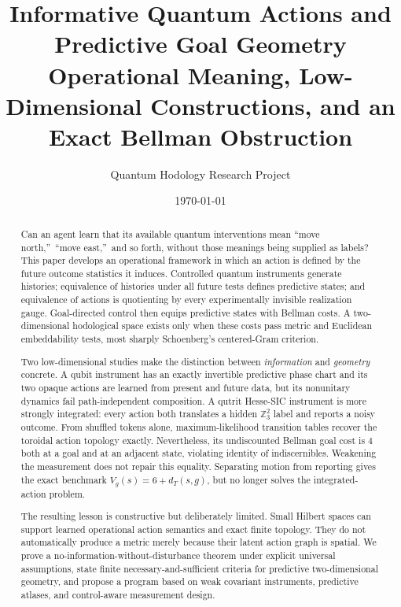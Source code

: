 \documentclass[11pt]{article}
\title{\textbf{Informative Quantum Actions and Predictive Goal Geometry}\\
\large Operational Meaning, Low-Dimensional Constructions, and an Exact Bellman Obstruction}
\author{Quantum Hodology Research Project}
\date{\today}
\theoremstyle{definition}
\theoremstyle{remark}
\newcommand{\Z}{\mathbb Z}
\begin{document}
\maketitle

\begin{abstract}
Can an agent learn that its available quantum interventions mean
\textquotedblleft move north,\textquotedblright\ \textquotedblleft move
east,\textquotedblright\ and so forth, without those meanings being supplied
as labels? This paper develops an operational framework in which an action is
defined by the future outcome statistics it induces. Controlled quantum
instruments generate histories; equivalence of histories under all future
tests defines predictive states; and equivalence of actions is quotienting by
every experimentally invisible realization gauge. Goal-directed control then
equips predictive states with Bellman costs. A two-dimensional hodological
space exists only when these costs pass metric and Euclidean embeddability
tests, most sharply Schoenberg's centered-Gram criterion.

Two low-dimensional studies make the distinction between \emph{information}
and \emph{geometry} concrete. A qubit instrument has an exactly invertible
predictive phase chart and its two opaque actions are learned from present and
future data, but its nonunitary dynamics fail path-independent composition. A
qutrit Hesse-SIC instrument is more strongly integrated: every action both
translates a hidden \(\Z_3^2\) label and reports a noisy outcome. From shuffled
tokens alone, maximum-likelihood transition tables recover the toroidal action
topology exactly. Nevertheless, its undiscounted Bellman goal cost is \(4\)
both at a goal and at an adjacent state, violating identity of
indiscernibles. Weakening the measurement does not repair this equality.
Separating motion from reporting gives the exact benchmark
\(V_g(s)=6+d_T(s,g)\), but no longer solves the integrated-action problem.

The resulting lesson is constructive but deliberately limited. Small Hilbert
spaces can support learned operational action semantics and exact finite
topology. They do not automatically produce a metric merely because their
latent action graph is spatial. We prove a no-information-without-disturbance
theorem under explicit universal assumptions, state finite
necessary-and-sufficient criteria for predictive two-dimensional geometry,
and propose a program based on weak covariant instruments, predictive atlases,
and control-aware measurement design.
\end{abstract}
\tableofcontents
\end{document}
